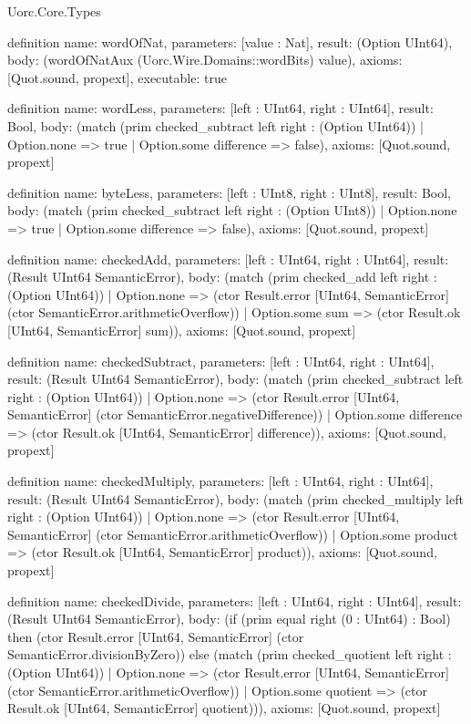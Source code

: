 \begin{lexlean}{Uorc.Core.Types}
\begin{semanticmodule}
definition{
  name: wordOfNat,
  parameters: [value : Nat],
  result: (Option UInt64),
  body: (wordOfNatAux (Uorc.Wire.Domains::wordBits) value),
  axioms: [Quot.sound, propext],
  executable: true
}

definition{
  name: wordLess,
  parameters: [left : UInt64, right : UInt64],
  result: Bool,
  body: (match (prim checked_subtract left right : (Option UInt64))
    | Option.none => true
    | Option.some difference => false),
  axioms: [Quot.sound, propext]
}

definition{
  name: byteLess,
  parameters: [left : UInt8, right : UInt8],
  result: Bool,
  body: (match (prim checked_subtract left right : (Option UInt8))
    | Option.none => true
    | Option.some difference => false),
  axioms: [Quot.sound, propext]
}

definition{
  name: checkedAdd,
  parameters: [left : UInt64, right : UInt64],
  result: (Result UInt64 SemanticError),
  body: (match (prim checked_add left right : (Option UInt64))
    | Option.none => (ctor Result.error [UInt64, SemanticError] (ctor SemanticError.arithmeticOverflow))
    | Option.some sum => (ctor Result.ok [UInt64, SemanticError] sum)),
  axioms: [Quot.sound, propext]
}

definition{
  name: checkedSubtract,
  parameters: [left : UInt64, right : UInt64],
  result: (Result UInt64 SemanticError),
  body: (match (prim checked_subtract left right : (Option UInt64))
    | Option.none => (ctor Result.error [UInt64, SemanticError] (ctor SemanticError.negativeDifference))
    | Option.some difference => (ctor Result.ok [UInt64, SemanticError] difference)),
  axioms: [Quot.sound, propext]
}

definition{
  name: checkedMultiply,
  parameters: [left : UInt64, right : UInt64],
  result: (Result UInt64 SemanticError),
  body: (match (prim checked_multiply left right : (Option UInt64))
    | Option.none => (ctor Result.error [UInt64, SemanticError] (ctor SemanticError.arithmeticOverflow))
    | Option.some product => (ctor Result.ok [UInt64, SemanticError] product)),
  axioms: [Quot.sound, propext]
}

definition{
  name: checkedDivide,
  parameters: [left : UInt64, right : UInt64],
  result: (Result UInt64 SemanticError),
  body: (if (prim equal right (0 : UInt64) : Bool) then (ctor Result.error [UInt64, SemanticError] (ctor SemanticError.divisionByZero)) else (match (prim checked_quotient left right : (Option UInt64))
    | Option.none => (ctor Result.error [UInt64, SemanticError] (ctor SemanticError.arithmeticOverflow))
    | Option.some quotient => (ctor Result.ok [UInt64, SemanticError] quotient))),
  axioms: [Quot.sound, propext]
}


\end{semanticmodule}
\end{lexlean}
